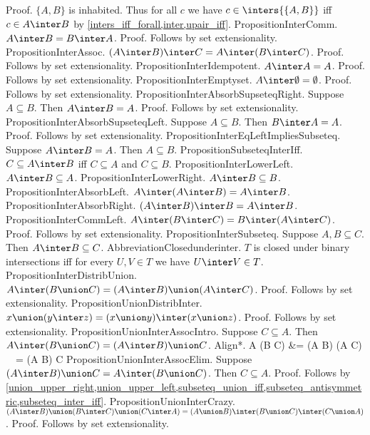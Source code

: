 Proof. $ \{A,B \}$ is inhabited. Thus for all $c$ we have $c \in \inters{ \{A,B \}}$ iff $c \in A \inter B$ by \cref{inters_iff_forall,inter,upair_iff}. %
PropositionInterComm. $A \inter B = B \inter A$.
Proof. Follows by set extensionality.
PropositionInterAssoc. $(A \inter B) \inter C = A \inter (B \inter C)$.
Proof. Follows by set extensionality.
PropositionInterIdempotent. $A \inter A = A$.
Proof. Follows by set extensionality.
PropositionInterEmptyset. $A \inter \emptyset = \emptyset$.
Proof. Follows by set extensionality.
PropositionInterAbsorbSupseteqRight. Suppose $A \subseteq B$. Then $A \inter B = A$.
Proof. Follows by set extensionality.
PropositionInterAbsorbSupseteqLeft. Suppose $A \subseteq B$. Then $B \inter A = A$.
Proof. Follows by set extensionality.
PropositionInterEqLeftImpliesSubseteq. Suppose $A \inter B = A$. Then $A \subseteq B$.
PropositionSubseteqInterIff. $C \subseteq A \inter B$ iff $C \subseteq A$ and $C \subseteq B$.
PropositionInterLowerLeft. $A \inter B \subseteq A$.
PropositionInterLowerRight. $A \inter B \subseteq B$.
PropositionInterAbsorbLeft. $A \inter (A \inter B) = A \inter B$.
PropositionInterAbsorbRight. $(A \inter B) \inter B = A \inter B$.
PropositionInterCommLeft. $A \inter (B \inter C) = B \inter (A \inter C)$.
Proof. Follows by set extensionality.
PropositionInterSubseteq. Suppose $A,B \subseteq C$. Then $A \inter B \subseteq C$.
AbbreviationClosedunderinter. $T$ is closed under binary intersections iff for every $U,V \in T$ we have $U \inter V \in T$.
PropositionInterDistribUnion. $A \inter (B \union C) = (A \inter B) \union (A \inter C)$.
Proof. Follows by set extensionality.
PropositionUnionDistribInter. $x \union (y \inter z) = (x \union y) \inter (x \union z)$.
Proof. Follows by set extensionality.
PropositionUnionInterAssocIntro. Suppose $C \subseteq A$. Then $A \inter (B \union C) = (A \inter B) \union C$.
Align*. A \inter (B \union C) &= (A \inter B) \union (A \inter C)  \ \ = (A \inter B) \union C 
PropositionUnionInterAssocElim. Suppose $(A \inter B) \union C = A \inter (B \union C)$. Then $C \subseteq A$.
Proof. Follows by \cref{union_upper_right,union_upper_left,subseteq_union_iff,subseteq_antisymmetric,subseteq_inter_iff}.
PropositionUnionInterCrazy. $(A \inter B) \union (B \inter C) \union (C \inter A) = (A \union B) \inter (B \union C) \inter (C \union A)$.
Proof. Follows by set extensionality.
